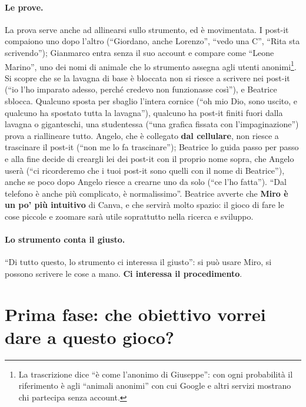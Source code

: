\paragraph{Le prove.} La prova serve anche ad allinearsi sullo strumento, ed è
movimentata. I post-it compaiono uno dopo l'altro (``Giordano, anche Lorenzo'',
``vedo una C'', ``Rita sta scrivendo''); Gianmarco entra senza il suo account e
compare come ``Leone Marino'', uno dei nomi di animale che lo strumento assegna
agli utenti anonimi\footnote{La trascrizione dice ``è come l'anonimo di Giuseppe'':
con ogni probabilità il riferimento è agli ``animali anonimi'' con cui Google e
altri servizi mostrano chi partecipa senza account.}. Si scopre che se la
lavagna di base è bloccata non si riesce a scrivere nei post-it (``io l'ho imparato
adesso, perché credevo non funzionasse così''), e Beatrice sblocca. Qualcuno sposta
per sbaglio l'intera cornice (``oh mio Dio, sono uscito, e qualcuno ha spostato tutta
la lavagna''), qualcuno ha post-it finiti fuori dalla lavagna o giganteschi, una
studentessa (``una grafica fissata con l'impaginazione'') prova a riallineare
tutto. Angelo, che è collegato \textbf{dal cellulare}, non riesce a trascinare il
post-it (``non me lo fa trascinare''); Beatrice lo guida passo per passo e alla fine
decide di creargli lei dei post-it con il proprio nome sopra, che Angelo userà
(``ci ricorderemo che i tuoi post-it sono quelli con il nome di Beatrice''), anche
se poco dopo Angelo riesce a crearne uno da solo (``ce l'ho fatta'').
``Dal telefono è anche più complicato, è normalissimo''. Beatrice avverte che
\textbf{Miro è un po' più intuitivo} di Canva, e che servirà molto spazio: il gioco di
fare le cose piccole e zoomare sarà utile soprattutto nella ricerca e sviluppo.

\paragraph{Lo strumento conta il giusto.} ``Di tutto questo, lo strumento ci interessa
il giusto'': si può usare Miro, si possono scrivere le cose a mano. \textbf{Ci
interessa il procedimento}.

\section{Prima fase: che obiettivo vorrei dare a questo gioco?}
\label{a7:sec:fase1}

